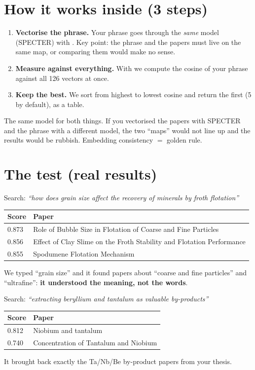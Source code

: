 \documentclass[11pt,a4paper]{article}
\begin{document}
\section{How it works inside (3 steps)}

\begin{enumerate}
  \item \textbf{Vectorise the phrase.} Your phrase goes through the \emph{same} model
        (SPECTER) with . Key point: the phrase and the papers
        must live on the same map, or comparing them would make no sense.
  \item \textbf{Measure against everything.} With  we compute the
        cosine of your phrase against all 126 vectors at once.
  \item \textbf{Keep the best.} We sort from highest to lowest cosine and return the first
         (5 by default), as a  table.
\end{enumerate}

\begin{ojo}
The same model for both things. If you vectorised the papers with SPECTER and the phrase with
a different model, the two ``maps'' would not line up and the results would be rubbish.
Embedding consistency $=$ golden rule.
\end{ojo}

\section{The test (real results)}

Search: \emph{``how does grain size affect the recovery of minerals by froth flotation''}
\begin{center}
\begin{tabular}{ll}
\textbf{Score} & \textbf{Paper} \\
\hline
0.873 & Role of Bubble Size in Flotation of Coarse and Fine Particles \\
0.856 & Effect of Clay Slime on the Froth Stability and Flotation Performance \\
0.855 & Spodumene Flotation Mechanism \\
\end{tabular}
\end{center}
We typed ``grain size'' and it found papers about ``coarse and fine particles'' and
``ultrafine'': \textbf{it understood the meaning, not the words}.

Search: \emph{``extracting beryllium and tantalum as valuable by-products''}
\begin{center}
\begin{tabular}{ll}
\textbf{Score} & \textbf{Paper} \\
\hline
0.812 & Niobium and tantalum \\
0.740 & Concentration of Tantalum and Niobium \\
\end{tabular}
\end{center}
It brought back exactly the Ta/Nb/Be by-product papers from your thesis.
\end{document}

